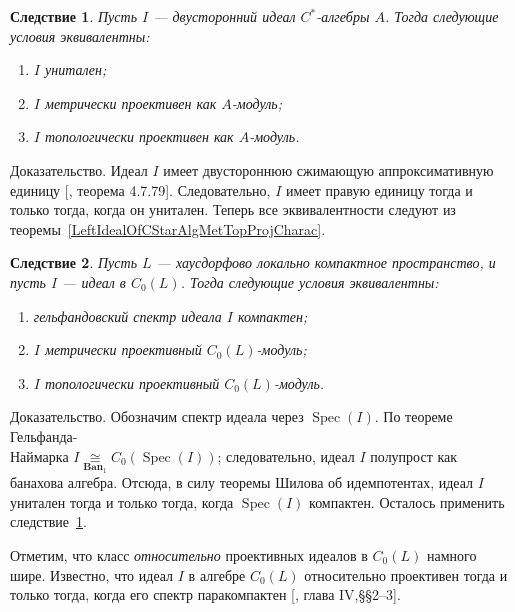 \documentclass[12pt]{article}
\numberwithin{equation}{subsection}
\theoremstyle{plain}
\newtheorem{corollary}{Следствие}
\newenvironment{proof}{Доказательство.}{}
\newcommand{\isom}[1]{\mathop{\mathbin{\cong}}\limits_{#1}}
\begin{document}
\begin{fulltext}
\begin{corollary}\label{BiIdealOfCStarAlgMetTopProjCharac} Пусть $I$ ---
двусторонний идеал $C^*$-алгебры $A$. Тогда следующие условия эквивалентны:
\begin{enumerate}[label = (\roman*)]
    \item $I$ унитален;

    \item $I$ метрически проективен как $A$-модуль;

    \item $I$ топологически проективен как $A$-модуль.
\end{enumerate}
\end{corollary}
\begin{proof} Идеал $I$ имеет двустороннюю сжимающую аппроксимативную единицу
[\cite{HelBanLocConvAlg}, теорема 4.7.79]. Следовательно, $I$ имеет правую
единицу тогда и только тогда, когда он унитален. Теперь все эквивалентности
следуют из теоремы~\ref{LeftIdealOfCStarAlgMetTopProjCharac}. 
\end{proof}

\begin{corollary}\label{IdealofCommCStarAlgMetTopProjCharac} Пусть $L$ ---
хаусдорфово локально компактное пространство, и пусть $I$ --- идеал в $C_0(L)$.
Тогда следующие условия эквивалентны:
\begin{enumerate}[label = (\roman*)]
    \item гельфандовский спектр идеала $I$ компактен;

    \item $I$ метрически проективный $C_0(L)$-модуль;

    \item $I$ топологически проективный $C_0(L)$-модуль.
\end{enumerate}
\end{corollary}
\begin{proof} Обозначим спектр идеала через $\operatorname{Spec}(I)$. По теореме
Гельфанда-\\Наймарка $I\isom{\mathbf{Ban}_1}C_0(\operatorname{Spec}(I))$;
следовательно, идеал $I$ полупрост как банахова алгебра. Отсюда, в силу теоремы
Шилова об идемпотентах, идеал $I$ унитален тогда и только тогда, когда
$\operatorname{Spec}(I)$ компактен. Осталось применить 
следствие~\ref{BiIdealOfCStarAlgMetTopProjCharac}. 
\end{proof}

Отметим, что класс \textit{относительно} проективных идеалов в $C_0(L)$ намного
шире. Известно, что идеал $I$ в алгебре $C_0(L)$ относительно проективен тогда и
только тогда, когда его спектр паракомпактен [\cite{HelHomolBanTopAlg}, глава
IV,\S\S 2--3].


\end{fulltext}
\end{document}
